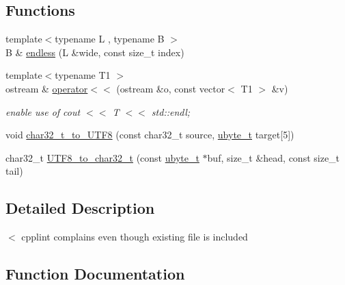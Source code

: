 \subsection*{Functions}
\begin{DoxyCompactItemize}
\item 
{\footnotesize template$<$typename L , typename B $>$ }\\B \& \hyperlink{namespacejlettvin_a62857af7d9bba9f83757e8c255c27921}{endless} (L \&wide, const size\+\_\+t index)
\item 
\hypertarget{namespacejlettvin_ae776f6a66f5697c5cb2afb2c6efdbfd7}{}{\footnotesize template$<$typename T1 $>$ }\\ostream \& \hyperlink{namespacejlettvin_ae776f6a66f5697c5cb2afb2c6efdbfd7}{operator$<$$<$} (ostream \&o, const vector$<$ T1 $>$ \&v)\label{namespacejlettvin_ae776f6a66f5697c5cb2afb2c6efdbfd7}

\begin{DoxyCompactList}\small\item\em enable use of cout $<$$<$ T $<$$<$ std\+::endl; \end{DoxyCompactList}\item 
void \hyperlink{namespacejlettvin_ab09212af893947acc85d4e6138b60ba2}{char32\+\_\+t\+\_\+to\+\_\+\+U\+T\+F8} (const char32\+\_\+t source, \hyperlink{namespacejlettvin_a7c7cf84f4fd67858c46a1077ed2e3ad4}{ubyte\+\_\+t} target\mbox{[}5\mbox{]})
\item 
char32\+\_\+t \hyperlink{namespacejlettvin_ae1f5a0c22c3f8c9eecb88f086bcbcc30}{U\+T\+F8\+\_\+to\+\_\+char32\+\_\+t} (const \hyperlink{namespacejlettvin_a7c7cf84f4fd67858c46a1077ed2e3ad4}{ubyte\+\_\+t} $\ast$buf, size\+\_\+t \&head, const size\+\_\+t tail)
\end{DoxyCompactItemize}


\subsection{Detailed Description}
$<$ cpplint complains even though existing file is included 

\subsection{Function Documentation}
\hypertarget{namespacejlettvin_ab09212af893947acc85d4e6138b60ba2}{}
